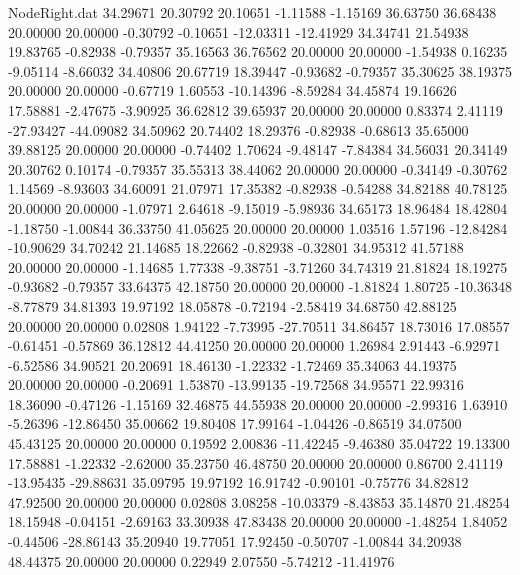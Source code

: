 \begin{filecontents}{NodeRight.dat}
  34.29671   20.30792   20.10651    -1.11588   -1.15169   36.63750   36.68438   20.00000   20.00000   -0.30792   -0.10651  -12.03311  -12.41929
  34.34741   21.54938   19.83765    -0.82938   -0.79357   35.16563   36.76562   20.00000   20.00000   -1.54938    0.16235   -9.05114   -8.66032
  34.40806   20.67719   18.39447    -0.93682   -0.79357   35.30625   38.19375   20.00000   20.00000   -0.67719    1.60553  -10.14396   -8.59284
  34.45874   19.16626   17.58881    -2.47675   -3.90925   36.62812   39.65937   20.00000   20.00000    0.83374    2.41119  -27.93427  -44.09082
  34.50962   20.74402   18.29376    -0.82938   -0.68613   35.65000   39.88125   20.00000   20.00000   -0.74402    1.70624   -9.48147   -7.84384
  34.56031   20.34149   20.30762     0.10174   -0.79357   35.55313   38.44062   20.00000   20.00000   -0.34149   -0.30762    1.14569   -8.93603
  34.60091   21.07971   17.35382    -0.82938   -0.54288   34.82188   40.78125   20.00000   20.00000   -1.07971    2.64618   -9.15019   -5.98936
  34.65173   18.96484   18.42804    -1.18750   -1.00844   36.33750   41.05625   20.00000   20.00000    1.03516    1.57196  -12.84284  -10.90629
  34.70242   21.14685   18.22662    -0.82938   -0.32801   34.95312   41.57188   20.00000   20.00000   -1.14685    1.77338   -9.38751   -3.71260
  34.74319   21.81824   18.19275    -0.93682   -0.79357   33.64375   42.18750   20.00000   20.00000   -1.81824    1.80725  -10.36348   -8.77879
  34.81393   19.97192   18.05878    -0.72194   -2.58419   34.68750   42.88125   20.00000   20.00000    0.02808    1.94122   -7.73995  -27.70511
  34.86457   18.73016   17.08557    -0.61451   -0.57869   36.12812   44.41250   20.00000   20.00000    1.26984    2.91443   -6.92971   -6.52586
  34.90521   20.20691   18.46130    -1.22332   -1.72469   35.34063   44.19375   20.00000   20.00000   -0.20691    1.53870  -13.99135  -19.72568
  34.95571   22.99316   18.36090    -0.47126   -1.15169   32.46875   44.55938   20.00000   20.00000   -2.99316    1.63910   -5.26396  -12.86450
  35.00662   19.80408   17.99164    -1.04426   -0.86519   34.07500   45.43125   20.00000   20.00000    0.19592    2.00836  -11.42245   -9.46380
  35.04722   19.13300   17.58881    -1.22332   -2.62000   35.23750   46.48750   20.00000   20.00000    0.86700    2.41119  -13.95435  -29.88631
  35.09795   19.97192   16.91742    -0.90101   -0.75776   34.82812   47.92500   20.00000   20.00000    0.02808    3.08258  -10.03379   -8.43853
  35.14870   21.48254   18.15948    -0.04151   -2.69163   33.30938   47.83438   20.00000   20.00000   -1.48254    1.84052   -0.44506  -28.86143
  35.20940   19.77051   17.92450    -0.50707   -1.00844   34.20938   48.44375   20.00000   20.00000    0.22949    2.07550   -5.74212  -11.41976

\end{filecontents}
